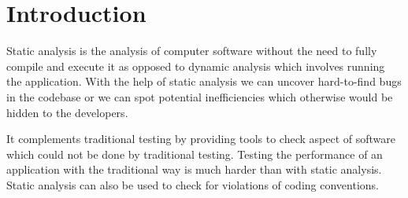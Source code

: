 \section{Introduction}
Static analysis is the analysis of computer software without the need to fully compile and execute it as opposed to dynamic analysis\cite{dynamic_analysis} which involves running the application. With the help of static analysis we can uncover hard-to-find bugs in the codebase or we can spot potential inefficiencies which otherwise would be hidden to the developers. 
\par It complements traditional testing by providing tools to check aspect of software which could not be done by traditional testing. Testing the performance of an application with the traditional way is much harder than with static analysis. Static analysis can also be used to check for violations of coding conventions.